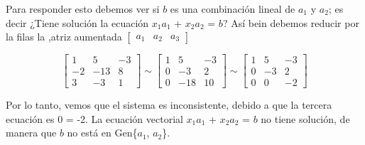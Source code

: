 \documentclass{article}
\begin{document}
Para responder esto debemos ver si \textbf{$b$} es una combinación lineal de \textbf{$a_1$} y \textbf{$a_2$}; es decir ¿Tiene solución la ecuación $x_1$\textbf{$a_1$} + $x_2$\textbf{$a_2$} = \textbf{$b$}? Así bein debemos reducir por la filas la ,atriz aumentada $\begin{bmatrix} a_1 & a_2 & a_3 \end{bmatrix}$

\begin{equation*}
    \left[\begin{array}{rrr}
    1 & 5 & -3 \\
    -2 & -13 & 8 \\
    3 & -3 & 1
    \end{array}\right] \sim\left[\begin{array}{rrr}
    1 & 5 & -3 \\
    0 & -3 & 2 \\
    0 & -18 & 10
    \end{array}\right] \sim\left[\begin{array}{rrr}
    1 & 5 & -3 \\
    0 & -3 & 2 \\
    0 & 0 & -2
    \end{array}\right]
\end{equation*}

Por lo tanto, vemos que el sistema es inconsistente, debido a que la tercera ecuación es  0 = -2. La ecuación vectorial $x_1$\textbf{$a_1$} + $x_2$\textbf{$a_2$} = \textbf{$b$} no tiene solución, de manera que \textbf{$b$} no está en Gen\{\textbf{$a_1$}, \textbf{$a_2$}\}.\cite{DavidC}

\pagebreak

\end{document}
